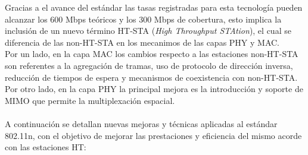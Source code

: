 Gracias a el avance del estándar las tasas registradas para esta tecnología pueden alcanzar los 600 Mbps teóricos y los 300 Mbps de cobertura, esto implica la inclusión de un nuevo término HT-STA (\textit{High Throughput STAtion}), el cual se diferencia de las non-HT-STA en los mecanimos de las capas PHY y MAC.\\
Por un lado, en la capa MAC los cambios respecto a las estaciones non-HT-STA son referentes a la agregación de tramas, uso de protocolo de dirección inversa, reducción de tiempos de espera y mecanismos de coexistencia con non-HT-STA. Por otro lado, en la capa PHY la principal mejora es la introducción y soporte de MIMO que permite la multiplexación espacial. \\\\

A continuación se detallan nuevas mejoras y técnicas aplicadas al estándar 802.11n, con el objetivo de mejorar las prestaciones y eficiencia del mismo acorde con las estaciones HT:
